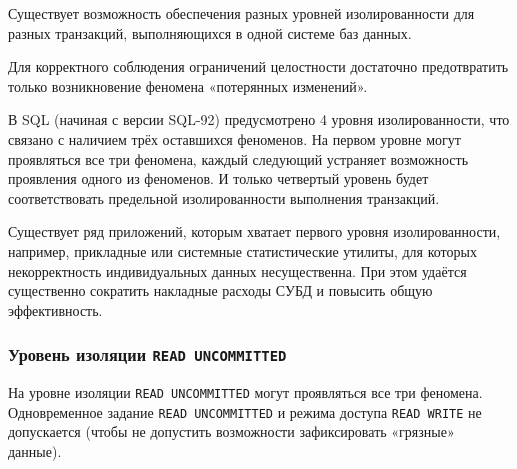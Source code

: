 \documentclass[a4paper,12pt]{article}
\begin{document}
Существует возможность обеспечения разных уровней изолированности для разных транзакций, выполняющихся в одной системе баз данных.

Для корректного соблюдения ограничений целостности достаточно предотвратить только возникновение феномена «потерянных изменений».

В SQL (начиная с версии SQL-92) предусмотрено 4 уровня изолированности, что связано с наличием трёх оставшихся феноменов. На первом уровне могут проявляться все три феномена, каждый следующий устраняет возможность проявления одного из феноменов. И только четвертый уровень будет соответствовать предельной изолированности выполнения транзакций.

Существует ряд приложений, которым хватает первого уровня изолированности, например, прикладные или системные статистические утилиты, для которых некорректность индивидуальных данных несущественна. При этом удаётся существенно сократить накладные расходы СУБД и повысить общую эффективность.

\subsubsection{Уровень изоляции \texttt{READ UNCOMMITTED}}

На уровне изоляции \texttt{READ UNCOMMITTED} могут проявляться все три феномена. Одновременное задание \texttt{READ UNCOMMITTED} и режима доступа \texttt{READ WRITE} не допускается (чтобы не допустить возможности зафиксировать «грязные» данные).
\end{document}
